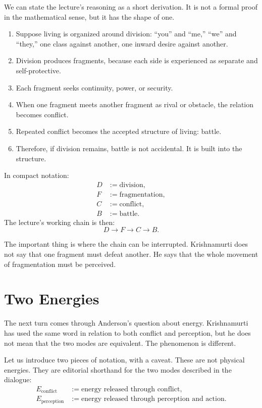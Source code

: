 We can state the lecture's reasoning as a short derivation. It is not a formal proof in the mathematical sense, but it has the shape of one.

\begin{enumerate}
\item Suppose living is organized around division: ``you'' and ``me,'' ``we'' and ``they,'' one class against another, one inward desire against another.
\item Division produces fragments, because each side is experienced as separate and self-protective.
\item Each fragment seeks continuity, power, or security.
\item When one fragment meets another fragment as rival or obstacle, the relation becomes conflict.
\item Repeated conflict becomes the accepted structure of living: battle.
\item Therefore, if division remains, battle is not accidental. It is built into the structure.
\end{enumerate}

In compact notation:
\begin{align}
D &:= \text{division},\\
F &:= \text{fragmentation},\\
C &:= \text{conflict},\\
B &:= \text{battle}.
\end{align}
The lecture's working chain is then:
\begin{equation}
D \longrightarrow F \longrightarrow C \longrightarrow B.
\end{equation}

The important thing is where the chain can be interrupted. Krishnamurti does not say that one fragment must defeat another. He says that the whole movement of fragmentation must be perceived.

\section{Two Energies}

The next turn comes through Anderson's question about energy. Krishnamurti has used the same word in relation to both conflict and perception, but he does not mean that the two modes are equivalent. The phenomenon is different.

Let us introduce two pieces of notation, with a caveat. These are not physical energies. They are editorial shorthand for the two modes described in the dialogue:
\begin{align}
E_{\mathrm{conflict}} &:= \text{energy released through conflict},\\
E_{\mathrm{perception}} &:= \text{energy released through perception and action}.
\end{align}

